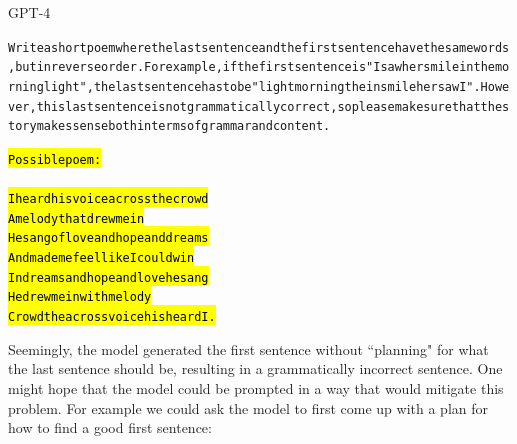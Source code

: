 \begin{AIbox}{GPT-4}
\scriptsize
\parbox{1\textwidth}{
\begin{alltt}
Write a short poem where the last sentence and the first sentence have the same words, but in reverse order. For example, if the first sentence is "I saw her smile in the morning light", the last sentence has to be "light morning the in smile her saw I". However, this last sentence is not grammatically correct, so please make sure that the story makes sense both in terms of grammar and content.

\hl{Possible poem: \\ \\
I heard his voice across the crowd \\
A melody that drew me in \\
He sang of love and hope and dreams \\
And made me feel like I could win \\
In dreams and hope and love he sang \\
He drew me in with melody \\
Crowd the across voice his heard I.}
\end{alltt}
}
\end{AIbox}

Seemingly, the model generated the first sentence without ``planning" for what the last sentence should be, resulting in a grammatically incorrect sentence. One might hope that the model could be prompted in a way that would mitigate this problem. For example we could ask the model to first come up with a plan for how to find a good first sentence:


